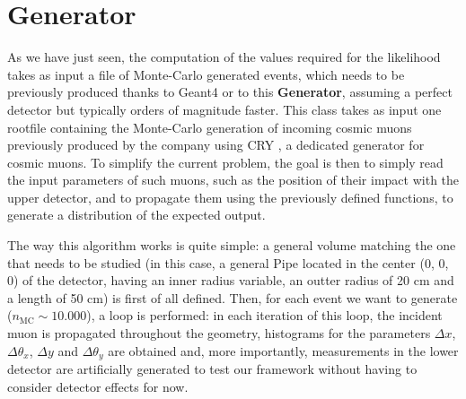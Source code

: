 \documentclass[a4paper, 11pt]{report}
\begin{document}
\begin{itemize}

    

\end{itemize}

\section{Generator} \label{sec:Generator}

As we have just seen, the computation of the values required for the likelihood takes as input a file of Monte-Carlo generated events, which needs to be previously produced thanks to Geant4 or to this \textbf{Generator}, assuming a perfect detector but typically orders of magnitude faster. This class takes as input one rootfile containing the Monte-Carlo generation of incoming cosmic muons previously produced by the company using CRY \cite{CRY}, a dedicated generator for cosmic muons. To simplify the current problem, the goal is then to simply read the input parameters of such muons, such as the position of their impact with the upper detector, and to propagate them using the previously defined functions, to generate a distribution of the expected output.

The way this algorithm works is quite simple: a general volume matching the one that needs to be studied (in this case, a general Pipe located in the center (0, 0, 0) of the detector, having an inner radius variable, an outter radius of 20 cm and a length of 50 cm) is first of all defined. Then, for each event we want to generate ($n_{\text{MC}} \sim 10.000$), a loop is performed: in each iteration of this loop, the incident muon is propagated throughout the geometry, histograms for the parameters $\Delta x$, $\Delta \theta_x$, $\Delta y$ and $\Delta \theta_y$ are obtained and, more importantly, measurements in the lower detector are artificially generated to test our framework without having to consider detector effects for now.
\end{document}
